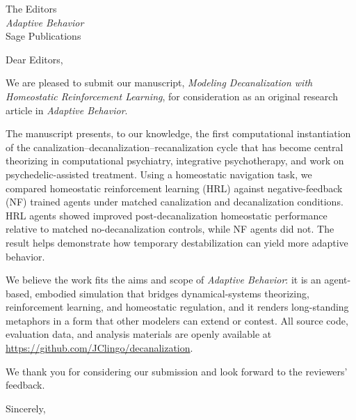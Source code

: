 \documentclass[11pt]{letter}
\begin{document}
\begin{letter}{The Editors \\ \emph{Adaptive Behavior} \\ Sage Publications}

\opening{Dear Editors,}

We are pleased to submit our manuscript, \emph{Modeling Decanalization with Homeostatic Reinforcement Learning}, for consideration as an original research article in \emph{Adaptive Behavior}.

The manuscript presents, to our knowledge, the first computational instantiation of the canalization–decanalization–recanalization cycle that has become central theorizing in computational psychiatry, integrative psychotherapy, and work on psychedelic-assisted treatment. Using a homeostatic navigation task, we compared homeostatic reinforcement learning (HRL) against negative-feedback (NF) trained agents under matched canalization and decanalization conditions. HRL agents showed improved post-decanalization homeostatic performance relative to matched no-decanalization controls, while NF agents did not. The result helps demonstrate how temporary destabilization can yield more adaptive behavior.

We believe the work fits the aims and scope of \emph{Adaptive Behavior}: it is an agent-based, embodied simulation that bridges dynamical-systems theorizing, reinforcement learning, and homeostatic regulation, and it renders long-standing metaphors in a form that other modelers can extend or contest. All source code, evaluation data, and analysis materials are openly available at \url{https://github.com/JClingo/decanalization}.

We thank you for considering our submission and look forward to the reviewers' feedback.

\closing{Sincerely,}

\end{letter}
\end{document}
